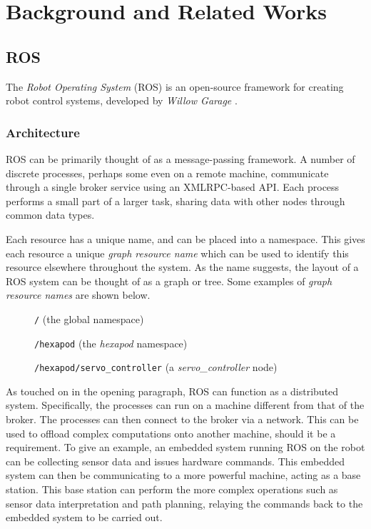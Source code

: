 \chapter{Background and Related Works}


\section{ROS}

The \emph{Robot Operating System} (ROS) is an open-source framework for creating robot control systems, developed by \emph{Willow Garage} \cite{ros_paper}.

\subsection{Architecture}
ROS can be primarily thought of as a message-passing framework. A number of discrete processes, perhaps some even on a remote machine, communicate through a single broker service using an XMLRPC-based API. Each process performs a small part of a larger task, sharing data with other nodes through common data types.

Each resource has a unique name, and can be placed into a namespace. This gives each resource a unique \emph{graph resource name} which can be used to identify this resource elsewhere throughout the system. As the name suggests, the layout of a ROS system can be thought of as a graph or tree. Some examples of \emph{graph resource names} are shown below.

\begin{figure}[h]
    \centering

    \texttt{/} (the global namespace)

    \texttt{/hexapod} (the \emph{hexapod} namespace)

    \texttt{/hexapod/servo\_controller} (a \emph{servo\_controller} node)
\end{figure}

As touched on in the opening paragraph, ROS can function as a distributed system. Specifically, the processes can run on a machine different from that of the broker. The processes can then connect to the broker via a network. This can be used to offload complex computations onto another machine, should it be a requirement. To give an example, an embedded system running ROS on the robot can be collecting sensor data and issues hardware commands. This embedded system can then be communicating to a more powerful machine, acting as a base station. This base station can perform the more complex operations such as sensor data interpretation and path planning, relaying the commands back to the embedded system to be carried out.

